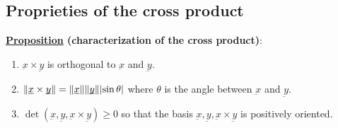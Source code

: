 \documentclass[10pt]{extarticle}
\newcommand{\munderbar}[1]{\underbar{\ensuremath{#1}}}
\begin{document}
\subsection{Proprieties of the cross product}

\textbf{\underline{Proposition} (characterization of the cross product)}:

\begin{enumerate}
    \item $\munderbar{x} \times \munderbar{y}$ is orthogonal to $\munderbar{x}$ and $\munderbar{y}$.
    \item $\norm{\munderbar{x} \times \munderbar{y}} = \norm{\munderbar{x}} \norm {\munderbar{y}} \abs{\sin \theta}$
          where $\theta$ is the angle between $\munderbar{x}$ and $\munderbar{y}$.
    \item $\det (\munderbar{x}, \munderbar{y}, \munderbar{x} \times \munderbar{y}) \geq 0$
          so that the basis $\munderbar{x}, \munderbar{y}, \munderbar{x} \times \munderbar{y}$ is positively oriented.
\end{enumerate}
\end{document}
